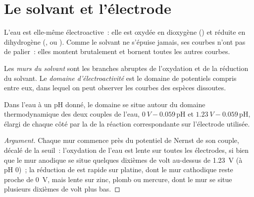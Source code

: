 \section{Le solvant et l'électrode}

L'eau est elle-même électroactive~: elle est oxydée en dioxygène
() et réduite en dihydrogène (, ou
). Comme le solvant ne s'épuise jamais, ses courbes
n'ont pas de palier~: elles montent brutalement et bornent toutes les autres courbes.

\begin{definition}\label{def:b2:current-potential-curves:window}
Les \emph{murs du solvant} sont les branches abruptes de
l'oxydation et de la réduction du solvant. Le \emph{domaine
d'électroactivité} est le domaine de potentiels compris entre eux,
dans lequel on peut observer les courbes des espèces dissoutes.
\end{definition}

\begin{proposition}\label{prop:b2:current-potential-curves:window}
Dans l'eau à un pH donné, le domaine se situe autour du domaine thermodynamique des
deux couples de l'eau, $\qty{0}{V} - 0.059\,\mathrm{pH}$ et $\qty{1.23}{V} -
0.059\,\mathrm{pH}$, élargi de chaque côté par la  de la
réaction correspondante sur l'électrode utilisée.
\end{proposition}

\begin{proof}[Argument]
Chaque mur commence près du potentiel de Nernst de son couple, décalé de la
 seuil~: l'oxydation de l'eau est lente sur toutes les électrodes, si bien que
le mur anodique se situe quelques dixièmes de volt au-dessus de \qty{1.23}{V} (à pH 0)~; la
réduction de  est rapide sur platine, dont le mur cathodique reste proche de
\qty{0}{V}, mais lente sur zinc, plomb ou mercure, dont le mur se situe plusieurs dixièmes de
volt plus bas.
\end{proof}


